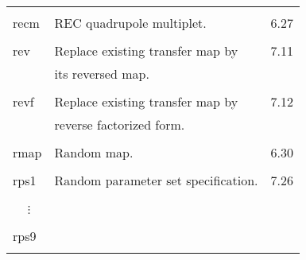 \begin{center}
\begin{tabular}{lll}
\vspace{-3mm}& &\\
\hspace{1.5em}recm    &   REC quadrupole multiplet.   & \hspace{2em}6.27\\
\vspace{-3mm}& &\\
\hspace{1.5em}rev   &  Replace existing transfer map by      & \hspace{2em}7.11\\
                    & its reversed map.            &\\
\vspace{-3mm}& &\\
\hspace{1.5em}revf  &  Replace existing transfer map by     & \hspace{2em}7.12\\
                    & reverse factorized form.                     &\\
\vspace{-3mm}& &\\
\hspace{1.5em}rmap    &   Random map.    & \hspace{2em}6.30\\
\vspace{-3mm}& &\\
\hspace{1.5em}rps1  &  Random parameter set specification.  & \hspace{2em}7.26\\
\vspace{-7mm}& &\\
\hspace{1.5em}\ \ \,$\vdots$ & &\\
\vspace{-7mm}& &\\
\hspace{1.5em}rps9  & &\\
\vspace{-3mm}& &\\
\end{tabular}


\end{center}
